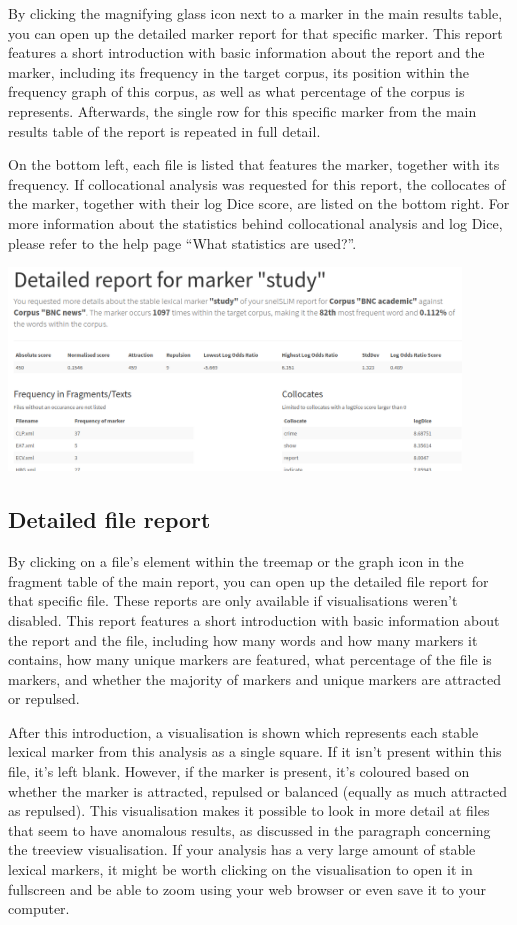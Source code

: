\documentclass[11pt,a4paper]{article}
\begin{document}
By clicking the magnifying glass icon next to a marker in the main results table, you can open up the detailed marker report for that specific marker. This report features a short introduction with basic information about the report and the marker, including its frequency in the target corpus, its position within the frequency graph of this corpus, as well as what percentage of the corpus is represents. Afterwards, the single row for this specific marker from the main results table of the report is repeated in full detail.

On the bottom left, each file is listed that features the marker, together with its frequency. If collocational analysis was requested for this report, the collocates of the marker, together with their log Dice score, are listed on the bottom right. For more information about the statistics behind collocational analysis and log Dice, please refer to the help page ``What statistics are used?''.

\centerline{\includegraphics[width=0.9\textwidth]{images/keyreport.png}}

\subsection{Detailed file report}

By clicking on a file's element within the treemap or the graph icon in the fragment table of the main report, you can open up the detailed file report for that specific file. These reports are only available if visualisations weren't disabled. This report features a short introduction with basic information about the report and the file, including how many words and how many markers it contains, how many unique markers are featured, what percentage of the file is markers, and whether the majority of markers and unique markers are attracted or repulsed. 

After this introduction, a visualisation is shown which represents each stable lexical marker from this analysis as a single square. If it isn't present within this file, it's left blank. However, if the marker is present, it's coloured based on whether the marker is attracted, repulsed or balanced (equally as much attracted as repulsed). This visualisation makes it possible to look in more detail at files that seem to have anomalous results, as discussed in the paragraph concerning the treeview visualisation. If your analysis has a very large amount of stable lexical markers, it might be worth clicking on the visualisation to open it in fullscreen and be able to zoom using your web browser or even save it to your computer.
\end{document}

